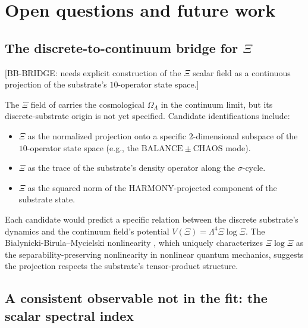 \documentclass[11pt,reqno]{amsart}
\theoremstyle{plain}
\theoremstyle{definition}
\theoremstyle{remark}
\begin{document}

\section{Open questions and future work}\label{sec:open}

\subsection{The discrete-to-continuum bridge for $\Xi$}\label{sec:bb-bridge}

[BB-BRIDGE: needs explicit construction of the $\Xi$ scalar
field as a continuous projection of the substrate's $10$-operator
state space.]

The $\Xi$ field of \cite{SandersGish2026JCAP} carries
the cosmological $\Omega_\Lambda$ in the continuum limit, but its
discrete-substrate origin is not yet specified. Candidate
identifications include:
\begin{itemize}
\item $\Xi$ as the normalized projection onto a specific
$2$-dimensional subspace of the $10$-operator state space (e.g.,
the $\mathrm{BALANCE} \pm \mathrm{CHAOS}$ mode).
\item $\Xi$ as the trace of the substrate's density operator
along the $\sigma$-cycle.
\item $\Xi$ as the squared norm of the
$\mathrm{HARMONY}$-projected component of the substrate state.
\end{itemize}
Each candidate would predict a specific relation between the
discrete substrate's dynamics and the continuum field's potential
$V(\Xi) = \Lambda^{4} \Xi \log \Xi$. The Bialynicki-Birula--Mycielski
nonlinearity \cite{BialynickiBirulaMycielski1976}, which uniquely
characterizes $\Xi \log \Xi$ as the separability-preserving
nonlinearity in nonlinear quantum mechanics, suggests the
projection respects the substrate's tensor-product structure.

\subsection{A consistent observable not in the fit: the scalar spectral index}\label{sec:prediction}
\end{document}
